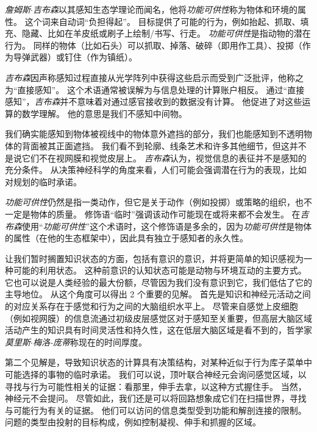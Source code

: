\begin{proposition}[启示、感知和知识] \label{box:56_1}
	
	\quad \quad \textit{詹姆斯$\cdot$吉布森}以其感知生态学理论而闻名，他将\textit{功能可供性}称为物体和环境的属性。
	这个词来自动词“负担得起”。
	目标提供了可能的行为，例如抬起、抓取、填充、隐藏、比如在羊皮纸或刷子上绘制/书写、行走。
	\textit{功能可供性}是指动物的潜在行为。
	同样的物体（比如石头）可以抓取、掉落、破碎（即用作工具）、投掷（作为导弹武器）或钉住（作为镇纸）。
	
	\quad \quad \textit{吉布森}因声称感知过程直接从光学阵列中获得这些启示而受到广泛批评，他称之为“直接感知”。
	这个术语通常被误解为与信息处理的计算账户相反。
	通过“直接感知”，\textit{吉布森}并不意味着对通过感官接收到的数据没有计算。
	他促进了对这些运算的数学理解。
	他的意思是我们不感知中间物。
	
	\quad \quad 我们确实能感知到物体被视线中的物体意外遮挡的部分，我们也能感知到不透明物体的背面被其正面遮挡。
	我们看不到轮廓、线条艺术和许多其他细节，但这并不是说它们不在视网膜和视觉皮层上。
	\textit{吉布森}认为，视觉信息的表征并不是感知的充分条件。
	从决策神经科学的角度来看，人们可能会强调潜在行为的表现，比如对规划的临时承诺。
	
	\quad \quad \textit{功能可供性}仍然是指一类动作，但它是关于动作（例如投掷）或策略的组织，也不一定是物体的质量。
	修饰语“临时”强调该动作可能现在或将来都不会发生。
	在\textit{吉布森}使用“\textit{功能可供性}”这个术语时，这个修饰语是多余的，因为\textit{功能可供性}是物体的属性（在他的生态框架中），因此具有独立于感知者的永久性。
	
\end{proposition}


让我们暂时搁置知识状态的方面，包括有意识的意识，并将更简单的知识感视为一种可能的利用状态。
这种前意识的认知状态可能是动物与环境互动的主要方式。
它也可以说是人类经验的最大份额，尽管因为我们没有意识到它，我们低估了它的主导地位。
从这个角度可以得出 2 个重要的见解。
首先是知识和神经元活动之间的对应关系存在于感觉和行为之间的大脑组织水平上。
尽管来自感觉上皮细胞（例如视网膜）的信息流通过初级皮层感觉区对于感知至关重要，但高层大脑区域活动产生的知识具有时间灵活性和持久性，这在低层大脑区域是看不到的，哲学家\textit{莫里斯$\cdot$梅洛-庞蒂}称现在的时间厚度。


第二个见解是，导致知识状态的计算具有决策结构，对某种近似于行为库子菜单中可能选择的事物的临时承诺。
我们可以说，顶叶联合神经元会询问感觉区域，以寻找与行为可能性相关的证据：看那里，伸手去拿，以这种方式握住手。
当然，神经元不会提问。
尽管如此，我们还是可以将回路想象成它们在扫描世界，寻找与可能行为有关的证据。
他们可以访问的信息类型受到功能和解剖连接的限制。
问题的类型由投射的目标构成，例如控制凝视、伸手和抓握的区域。


